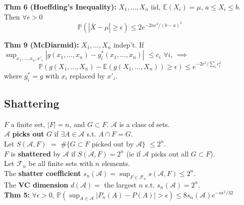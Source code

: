 \documentclass[10pt,twocolumn]{article}
\begin{document}
\textbf{Thm 6 (Hoeffding's Inequality):}
$X_{1},\ldots,X_{n}$ iid, $\mathbb{E}(X_{i}) = \mu$, $a \leq X_{i} \leq b$. Then $\forall \epsilon >0$
\begin{equation}
    \mathbb{P}(|\overline{X} - \mu| \geq \epsilon) \leq 2e^{-2n\epsilon^{2}/(b-a)^{2}}
\end{equation}

\textbf{Thm 9 (McDiarmid):} $X_{1},\ldots,X_{n}$ indep't. If\\
$\sup_{x_{1},\ldots,x_{n},x'_{i}} \left| g(x_{1},\ldots,x_{n}) - g_{i}^{*}(x_{1},\ldots,x_{n}) \right|$ $\leq c_{i}$ $\forall i$, $\implies$
\begin{equation}
    \mathbb{P} \left(g(X_{1},\ldots,X_{n})-\mathbb{E}(g(X_{1},\ldots,X_{n})) \geq \epsilon \right) \leq e^{-2\epsilon^{2}/\sum_{i}c_{i}^{2}}
\end{equation}
where $g_{i}^{*} = g$ with $x_{i}$ replaced by $x'_{i}$.





\subsection*{Shattering}
$F$ a finite set, $|F| = n$, and $G \subset F$. $\mathcal{A}$ is a class of sets.\\
$\mathcal{A}$ \textbf{picks out} $G$ if $\exists A \in \mathcal{A}$ s.t. $A \cap F = G$.\\
Let $S(\mathcal{A},F)$ $=$ $\#\{G \subset F \text{ picked out by } \mathcal{A}\}$ $\leq 2^{n}$.\\
$F$ is \textbf{shattered} by $\mathcal{A}$ if $S(\mathcal{A},F) = 2^{n}$ (ie if $\mathcal{A}$ picks out all $G \subset F$).\\
Let $\mathcal{F}_{n}$ be all finite sets with $n$ elements.\\
The \textbf{shatter coefficient} $s_{n}(\mathcal{A}) = \sup_{F \in \mathcal{F}_{n}} s(\mathcal{A},F) \leq 2^{n}$.\\
The \textbf{VC dimension} $d(\mathcal{A}) =$ the largest $n$ s.t. $s_{n}(\mathcal{A}) = 2^{n}$.\\
\textbf{Thm 5:} $\forall \epsilon>0$, $\mathbb{P}(\sup_{A \in \mathcal{A}} |P_{n}(A) - P(A)| > \epsilon) \leq 8 s_{n}(\mathcal{A})e^{-n\epsilon^{2}/32}$
\end{document}
